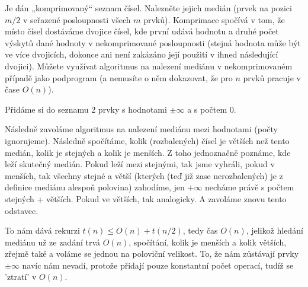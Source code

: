 \documentclass[12pt]{article}                   %
\begin{document}
    \begin{priklad}[medián]
        Je dán „komprimovaný“ seznam čísel. Nalezněte jejich medián (prvek na pozici $m/2$ v seřazené posloupnosti všech $m$ prvků). Komprimace spočívá v tom, že místo čísel dostáváme dvojice čísel, kde první udává hodnotu a druhé počet výskytů dané hodnoty v nekomprimované posloupnosti (stejná hodnota může být ve více dvojicích, dokonce ani není zakázáno její použití v ihned následující dvojici). Můžete využívat algoritmus na nalezení mediánu v nekomprimovaném případě jako podprogram (a nemusíte o něm dokazovat, že pro $n$ prvků pracuje v čase $O(n)$). 

        \begin{reseni}
            Přidáme si do seznamu 2 prvky s hodnotami $± ∞$ a s počtem 0.

            Následně zavoláme algoritmus na nalezení mediánu mezi hodnotami (počty ignorujeme). Následně spočítáme, kolik (rozbalených) čísel je větších než tento medián, kolik je stejných a kolik je menších. Z toho jednoznačně poznáme, kde leží skutečný medián. Pokud leží mezi stejnými, tak jsme vyhráli, pokud v menších, tak všechny stejné a větší (kterých (teď již zase nerozbalených) je z definice mediánu alespoň polovina) zahodíme, jen $+∞$ necháme právě s počtem stejných + větších. Pokud ve větších, tak analogicky. A zavoláme znovu tento odstavec.

            To nám dává rekurzi $t(n) ≤ O(n) + t(n/2)$, tedy čas $O(n)$, jelikož hledání mediánu už ze zadání trvá $O(n)$, spočítání, kolik je menších a kolik větších, zřejmě také a voláme se jednou na poloviční velikost. To, že nám zůstávají prvky $±∞$ navíc nám nevadí, protože přidají pouze konstantní počet operací, tudíž se 'ztratí' v $O(n)$.
        \end{reseni}
    \end{priklad}
\end{document}
